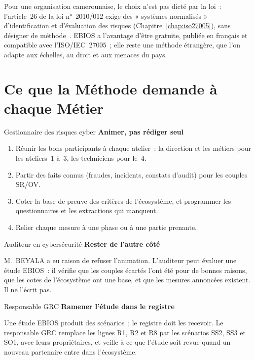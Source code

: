Pour une organisation camerounaise, le choix n'est pas dicté par la loi~:
l'article~26 de la loi n°~2010/012 exige des « systèmes normalisés »
d'identification et d'évaluation des risques (Chapitre~\ref{chap:iso27005}),
sans désigner de méthode~\cite{loi2010012}. EBIOS a l'avantage d'être
gratuite, publiée en français et compatible avec l'ISO/IEC~27005~; elle
reste une méthode étrangère, que l'on adapte aux échelles, au droit et aux
menaces du pays.

\section{Ce que la Méthode demande à chaque Métier}
\label{sec:c04-metiers}

\begin{boxmetier}{Gestionnaire des risques cyber}
\textbf{Animer, pas rédiger seul}
\begin{enumerate}
    \item Réunir les bons participants à chaque atelier~: la direction et
          les métiers pour les ateliers~1 à~3, les techniciens pour le~4.
    \item Partir des faits connus (fraudes, incidents, constats d'audit)
          pour les couples SR/OV.
    \item Coter la base de preuve des critères de l'écosystème, et
          programmer les questionnaires et les extractions qui manquent.
    \item Relier chaque mesure à une phase ou à une partie prenante.
\end{enumerate}
\end{boxmetier}

\begin{boxmetier}{Auditeur en cybersécurité}
\textbf{Rester de l'autre côté}

M.~BEYALA a eu raison de refuser l'animation. L'auditeur peut évaluer une
étude EBIOS~: il vérifie que les couples écartés l'ont été pour de bonnes
raisons, que les cotes de l'écosystème ont une base, et que les mesures
annoncées existent. Il ne l'écrit pas.
\end{boxmetier}

\begin{boxmetier}{Responsable GRC}
\textbf{Ramener l'étude dans le registre}

Une étude EBIOS produit des scénarios~; le registre doit les recevoir. Le
responsable GRC remplace les lignes R1, R2 et R8 par les scénarios SS2,
SS3 et SO1, avec leurs propriétaires, et veille à ce que l'étude soit
revue quand un nouveau partenaire entre dans l'écosystème.
\end{boxmetier}


